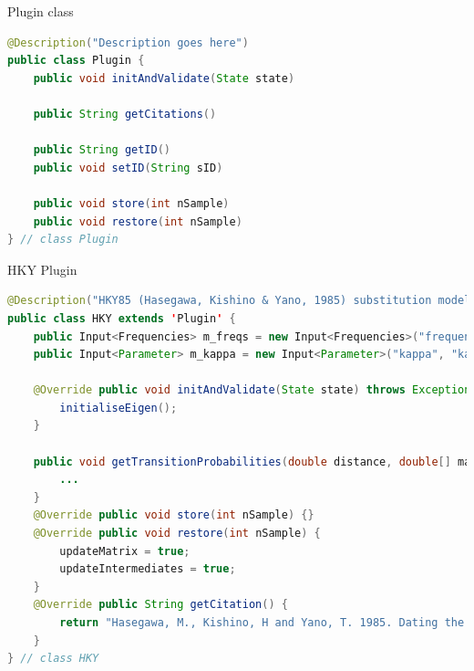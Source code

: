 \documentclass{beamer}
\theoremstyle{definition}
\begin{document}
\begin{frame}[containsverbatim]
{\Large Plugin class}

\begin{lstlisting}[language=java]
@Description("Description goes here")
public class Plugin {
    public void initAndValidate(State state)

    public String getCitations()

    public String getID()
    public void setID(String sID)

    public void store(int nSample)
    public void restore(int nSample)
} // class Plugin
\end{lstlisting}

\end{frame}
\begin{frame}[containsverbatim]
{\large HKY Plugin}

{
\tiny
\begin{lstlisting}[language=java]
@Description("HKY85 (Hasegawa, Kishino & Yano, 1985) substitution model of nucleotide evolution.")
public class HKY extends 'Plugin' {
    public Input<Frequencies> m_freqs = new Input<Frequencies>("frequencies", "frequencies nucleotide letters");
    public Input<Parameter> m_kappa = new Input<Parameter>("kappa", "kappa parameter in HKY model", Validate.REQUIRED);

    @Override public void initAndValidate(State state) throws Exception {
        initialiseEigen();        
    }

    public void getTransitionProbabilities(double distance, double[] matrix, State state) {
        ...
    }
    @Override public void store(int nSample) {}
    @Override public void restore(int nSample) {
        updateMatrix = true;
        updateIntermediates = true;
    }
    @Override public String getCitation() {
        return "Hasegawa, M., Kishino, H and Yano, T. 1985. Dating the human-ape splitting by a molecular clock of mitochondrial DNA. Journal of Molecular Evolution 22:160-174.";
    }
} // class HKY
\end{lstlisting}
}
\end{frame}
\end{document}
